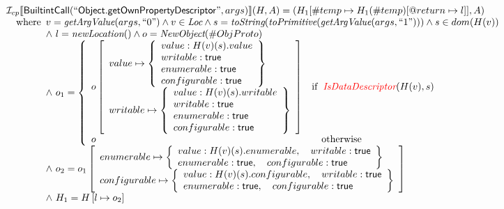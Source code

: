 \[\begin{array}{l}
\mathcal{I} _{cp}\llbracket \mbox{\textsf{BuiltintCall}}(``\mbox{\textsf{Object.getOwnPropertyDescriptor}}",args)\rrbracket(H,A)
 = (H_1[\#temp \mapsto H_1(\#temp)[@return \mapsto l]], A)\\
  \quad{\rm where}\begin{array}[t]{l}
  v = \emph{getArgValue}(args, ``0") \land v \in\emph{Loc}
  \land s = \emph{toString}(\emph{toPrimitive}(\emph{getArgValue}(args,``1"))) \land s \in dom(H(v))\\
  \land\ l=\emph{newLocation}() \land o=\emph{NewObject}(\#ObjProto)\\
  \land\ o_1 = \left\{
    \begin{array}{ll}
      o\left[
      \begin{array}{l}
        value \mapsto \left\{
        \begin{array}{l}
          value: H(v)(s).value\\
          writable: \mbox{\textsf{true}} \\
          enumerable: \mbox{\textsf{true}}\\
          configurable: \mbox{\textsf{true}} \\
        \end{array}
        \right\}\\
        writable \mapsto \left\{
        \begin{array}{l}
          value: H(v)(s).writable\\
          writable: \mbox{\textsf{true}} \\
          enumerable: \mbox{\textsf{true}}\\
          configurable: \mbox{\textsf{true}} \\
        \end{array}
        \right\}\\
      \end{array}\right] & {\rm if}\begin{array}[t]{l}\emph{\color{red}IsDataDescriptor}(H(v),s)\end{array}\\
      o  & \quad{\rm otherwise}
    \end{array}\right.\\
  \land\ o_2 = o_1\left[
    \begin{array}{l}
      enumerable \mapsto \left\{
        \begin{array}{l}
          value: H(v)(s).enumerable, \quad writable: \mbox{\textsf{true}} \\
          enumerable: \mbox{\textsf{true}}, \quad configurable: \mbox{\textsf{true}} \\
        \end{array}
        \right\}\\
      configurable \mapsto \left\{
        \begin{array}{l}
          value: H(v)(s).configurable, \quad writable: \mbox{\textsf{true}} \\
          enumerable: \mbox{\textsf{true}}, \quad configurable: \mbox{\textsf{true}} \\
        \end{array}
        \right\}\\
    \end{array}\right]\\
  \land\ H_1=H\left[l\mapsto o_2\right]\end{array}\\
\\\\




\end{array}\]
